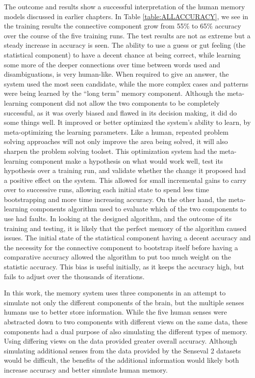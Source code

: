 The outcome and results show a successful interpretation of the human memory
models discussed in earlier chapters. In Table \ref{table:ALLACCURACY}, we see in
the training results the connective component grow from 55\% to 65\% accuracy
over the course of the five training runs. The test results are not as extreme
but a steady increase in accuracy is seen.  The ability to use a guess or gut
feeling (the statistical component) to have a decent chance at being correct,
while learning some more of the deeper connections over time between words used
and disambiguations, is very human-like.  When required to give an answer, the
system used the most seen candidate, while the more complex cases and patterns
were being learned by the ``long term'' memory component.  Although the meta-learning component did not allow the two components to be completely successful,
as it was overly biased and flawed in its decision making, it did do some things
well. It improved or better optimized the system's ability to learn, by meta-optimizing the learning parameters. Like a human, repeated problem solving
approaches will not only improve the area being solved, it will also sharpen the
problem solving toolset. This optimization system had the meta-learning
component make a hypothesis on what would work well, test its hypothesis over a
training run, and validate whether the change it proposed had a positive effect
on the system. This allowed for small incremental gains to carry over to
successive runs, allowing each initial state to spend less time bootstrapping
and more time increasing accuracy. On the other hand, the meta-learning
components algorithm used to evaluate which of the two components to use had
faults.  In looking at the designed algorithm, and the outcome of its training
and testing, it is likely that the perfect memory of the algorithm caused issues.
The initial state of the statistical component having a decent accuracy and the
necessity for the connective component to bootstrap itself before having a
comparative accuracy allowed the algorithm to put too much weight on the
statistic accuracy.  This bias is useful initially, as it keeps the accuracy
high, but fails to adjust over the thousands of iterations.

In this work, the memory system uses three components in an attempt to simulate
not only the different components of the brain, but the multiple senses humans
use to better store information. While the five human senses were abstracted
down to two components with different views on the same data, these components
had a dual purpose of also simulating the different types of memory. 
Using differing views on the data provided greater overall
accuracy. Although simulating additional senses from the data provided by the
Senseval 2 datasets would be difficult, the benefits of the additional
information would likely both increase accuracy and better simulate human
memory.

